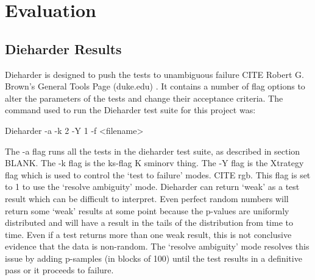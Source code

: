 \chapter{Evaluation}

\section{Dieharder Results}

Dieharder is designed to push the tests to unambiguous failure CITE Robert G. Brown's General Tools Page (duke.edu) . It contains a number of flag options to alter the parameters of the tests and change their acceptance criteria. The command used to run the Dieharder test suite for this project was:\newline

Dieharder -a -k 2 -Y 1 -f <filename>\newline

The -a flag runs all the tests in the dieharder test suite, as described in  section BLANK. The -k flag is the ks-flag K sminorv thing. The -Y flag is the Xtrategy flag which is used to control the ‘test to failure’ modes. CITE  rgb. This flag is set to 1 to use the ‘resolve ambiguity’ mode. Dieharder can return ‘weak’ as a test result which can be difficult to interpret. Even perfect random numbers will return some ‘weak’ results at some point because the p-values are uniformly distributed and will have a result in the tails of the distribution from time to time. Even if a test returns more than one weak result, this is not conclusive evidence that the data is non-random. The ‘resolve ambiguity’ mode resolves this issue by adding p-samples (in blocks of 100) until the test results in a definitive pass or it proceeds to failure. 

